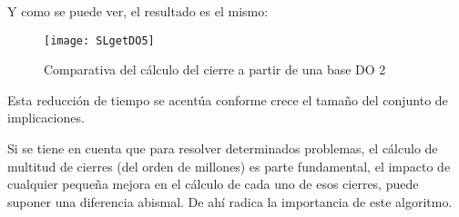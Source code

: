 Y como se puede ver, el resultado es el mismo:
\begin{figure}[H]
    \centering
    \texttt{[image: SLgetDO5]}
    \caption{Comparativa del c\'alculo del cierre a partir de una base DO 2}
    \label{fig:SLgetDO5}
\end{figure}

Esta reducci\'on de tiempo se acent\'ua conforme crece el tama\~no del conjunto de implicaciones.

Si se tiene en cuenta que para resolver determinados problemas, el c\'alculo de multitud de cierres (del orden de millones) es parte fundamental,\cite{Adaricheva} el impacto de cualquier peque\~na mejora en el c\'alculo de cada uno de esos cierres, puede suponer una diferencia abismal. De ah\'i radica la importancia de este algoritmo.

